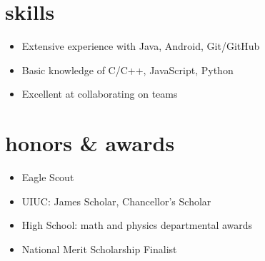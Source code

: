 \documentclass[nofooter]{resume}
\begin{document}

\section{skills}

\noindent\begin{itemize}[leftmargin=0.45cm]
\setlength{\itemsep}{-5pt}
\item Extensive experience with Java, Android, Git/GitHub
\item Basic knowledge of C/C++, JavaScript, Python
\item Excellent at collaborating on teams
\end{itemize}\vspace{\parskip}



\section{honors \& awards}

\noindent\begin{itemize}[leftmargin=0.45cm]
\setlength{\itemsep}{-5pt}
\item Eagle Scout
\item UIUC: James Scholar, Chancellor's Scholar
\item High School: math and physics departmental awards
\item National Merit Scholarship Finalist
\end{itemize}
\end{document}
